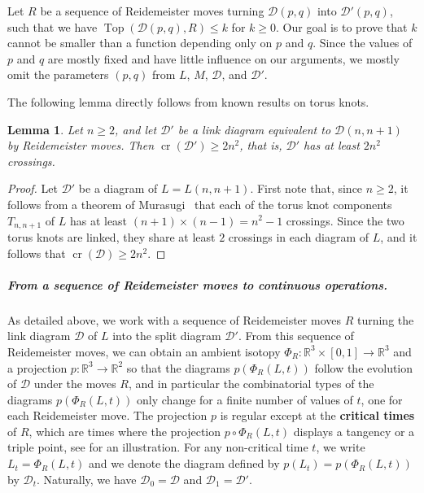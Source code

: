 \documentclass{article}
\newcommand{\R}{\mathbb{R}}
\newcommand{\cross}{\operatorname{cr}}
\newcommand{\addcross}{\operatorname{Top}}
\newtheorem{lemma}[theorem]{Lemma}
\begin{document}
Let $R$ be a sequence of Reidemeister moves turning $\mathcal{D}(p,q)$ into $\mathcal{D}'(p,q)$, such that we have $\addcross(\mathcal{D}(p,q),R) \leq k$ for $k \geq 0$. Our goal is to prove that $k$ cannot be smaller than a function depending only on $p$ and $q$. Since the values of $p$ and $q$ are mostly fixed and have little influence on our arguments, we mostly omit the parameters $(p,q)$ from $L$, $M$, $\mathcal{D}$, and $\mathcal{D}'$.

The following lemma directly follows from known results on torus knots.

\begin{lemma}\label{lem_min_cross_diag}
Let $n\geq 2$, and let $\mathcal{D}'$ be a link diagram equivalent to $\mathcal{D} (n,n+1)$ by Reidemeister moves. Then $\cross(\mathcal{D}') \geq 2n^2$, that is, $\mathcal{D}'$ has at least $2 n^2$ crossings.
\end{lemma}

\begin{proof}
Let $\mathcal{D}'$ be a diagram of $L=L(n,n+1)$. First note that, since $n\geq 2$, it follows from a theorem of Murasugi~\cite[Proposition 7.5]{Murasugi_crossings_torus} that each of the torus knot components $T_{n,n+1}$ of $L$ has at least $(n+1) \times (n-1) = n^2 -1$ crossings. Since the two torus knots are linked, they share at least $2$ crossings in each diagram of $L$, and it follows that $\cross(\mathcal{D}) \geq 2n^2$.
\end{proof}

\subparagraph*{From a sequence of Reidemeister moves to continuous operations.} As detailed above, we work with a sequence of Reidemeister moves $R$ turning the link diagram $\mathcal{D}$ of $L$ into the split diagram $\mathcal{D}'$. From this sequence of Reidemeister moves, we can obtain an ambient isotopy $\Phi_R : \R^3 \times [0,1] \to \R^3$ and a projection $p: \R^3 \rightarrow \R^2$ so that the diagrams $p(\Phi_R(L,t))$ follow the evolution of $\mathcal{D}$ under the moves $R$, and in particular the combinatorial types of the diagrams $p(\Phi_R(L,t))$ only change for a finite number of values of $t$, one for each Reidemeister move. The projection $p$ is regular except at the \textbf{critical times} of $R$, which are times where the projection $p \circ \Phi_R(L,t)$ displays a tangency or a triple point, see  for an illustration. 
For any non-critical time $t$, we write $L_t = \Phi_R(L,t)$ and we denote the diagram defined by $p(L_t) = p(\Phi_R(L,t))$ by $\mathcal{D}_t$. Naturally, we have $\mathcal{D}_0 = \mathcal{D}$ and $\mathcal{D}_1 = \mathcal{D}'$.
\end{document}

